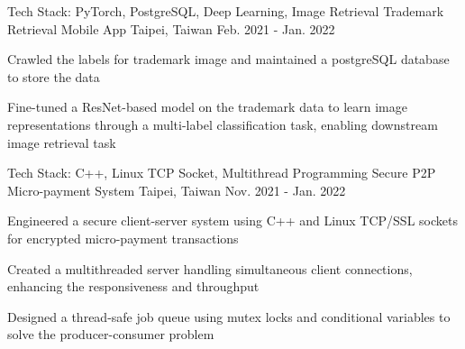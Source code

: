 \begin{cventries}
  \cventry
    {\color{awesome} Tech Stack: PyTorch, PostgreSQL, Deep Learning, Image Retrieval} %
    {Trademark Retrieval Mobile App}
    {Taipei, Taiwan} %
    {Feb. 2021 - Jan. 2022} %
    {
      \begin{cvitems} %
        \item {Crawled the labels for trademark image and maintained a postgreSQL database to store the data}
        \item {Fine-tuned a ResNet-based model on the trademark data to learn image representations through a multi-label classification task, enabling downstream image retrieval task}
      \end{cvitems}
    }

  \cventry
    {\color{awesome} Tech Stack: C++, Linux TCP Socket, Multithread Programming} %
    {Secure P2P Micro-payment System}
    {Taipei, Taiwan} %
    {Nov. 2021 - Jan. 2022} %
    {
      \begin{cvitems} %
        \item {Engineered a secure client-server system using C++ and Linux TCP/SSL sockets for encrypted micro-payment transactions}
        \item {Created a multithreaded server handling simultaneous client connections, enhancing the responsiveness and throughput}
        \item {Designed a thread-safe job queue using mutex locks and conditional variables to solve the producer-consumer problem}
      \end{cvitems}
    }



\end{cventries}
